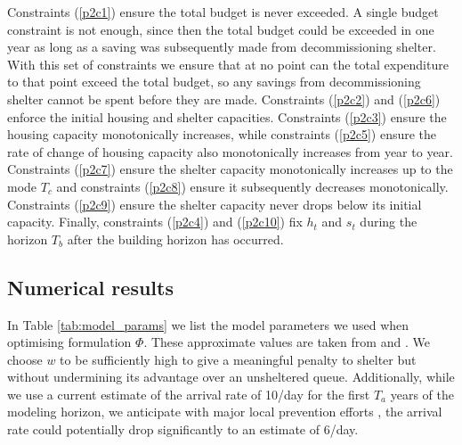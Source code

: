 \documentclass[12pt,a4paper]{article}
\begin{document}
Constraints (\ref{p2c1}) ensure the total budget is never exceeded. A single budget constraint is not enough, since then the total budget could be exceeded in one year as long as a saving was subsequently made from decommissioning shelter. With this set of constraints we ensure that at no point can the total expenditure to that point exceed the total budget, so any savings from decommissioning shelter cannot be spent before they are made. Constraints (\ref{p2c2}) and (\ref{p2c6}) enforce the initial housing and shelter capacities. Constraints (\ref{p2c3}) ensure the housing capacity monotonically increases, while constraints (\ref{p2c5}) ensure the rate of change of housing capacity also monotonically increases from year to year. Constraints (\ref{p2c7}) ensure the shelter capacity monotonically increases up to the mode $T_c$ and constraints (\ref{p2c8}) ensure it subsequently decreases monotonically. Constraints (\ref{p2c9}) ensure the shelter capacity never drops below its initial capacity. Finally, constraints (\ref{p2c4}) and (\ref{p2c10}) fix $h_t$ and $s_t$ during the horizon $T_b$ after the building horizon has occurred.
%
\subsection{Numerical results} \label{results}

In Table \ref{tab:model_params} we list the model parameters we used when optimising formulation $\Phi$. These approximate values are taken from \cite{hometogether2022} and \cite{singham2023discrete}. We choose $w$ to be sufficiently high to give a meaningful penalty to shelter but without undermining its advantage over an unsheltered queue. Additionally, while we use a current estimate of the arrival rate of 10/day for the first $T_a$ years of the modeling horizon, we anticipate with major local prevention efforts \citep{RICActionPlan}, the arrival rate could potentially drop significantly to an estimate of 6/day.
\end{document}
